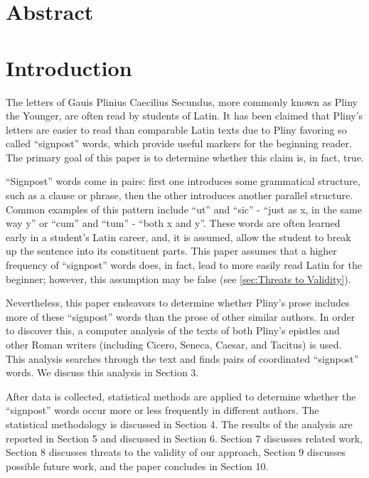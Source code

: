 \section{Abstract}
    

\section{Introduction}

The letters of Gauis Plinius Caecilius Secundus, more commonly known as Pliny the Younger, are often read by students of Latin.  It has been claimed \cite{Woodmanpm} that Pliny's letters are easier to read than comparable Latin texts due to Pliny favoring so called ``signpost'' words, which provide useful markers for the beginning reader. The primary goal of this paper is to determine whether this claim is, in fact, true.

``Signpost'' words come in pairs: first one introduces some grammatical structure, such as a clause or phrase, then the other introduces another parallel structure. Common examples of this pattern include ``ut'' and ``sic'' - ``just as x, in the same way y'' or ``cum'' and ``tum'' - ``both x and y''. These words are often learned early in a student's Latin career, and, it is assumed, allow the student to break up the sentence into its constituent parts. This paper assumes that a higher frequency of ``signpost'' words does, in fact, lead to more easily read Latin for the beginner; however, this assumption may be false (see \ref{sec:Threats to Validity}).

Nevertheless, this paper endeavors to determine whether Pliny's prose includes more of these ``signpost'' words than the prose of other similar authors. In order to discover this, a computer analysis of the texts of both Pliny's epistles and other Roman writers (including Cicero, Seneca, Caesar, and Tacitus) is used. This analysis searches through the text and finds pairs of coordinated ``signpost'' words. We discuss this analysis in Section 3.
 
After data is collected, statistical methods are applied to determine whether the ``signpost'' words occur more or less frequently in different authors. The statistical methodology is discussed in Section 4. The results of the analysis are reported in Section 5 and discussed in Section 6. Section 7 discusses related work, Section 8 discusses threats to the validity of our approach, Section 9 discusses possible future work, and the paper concludes in Section 10.

